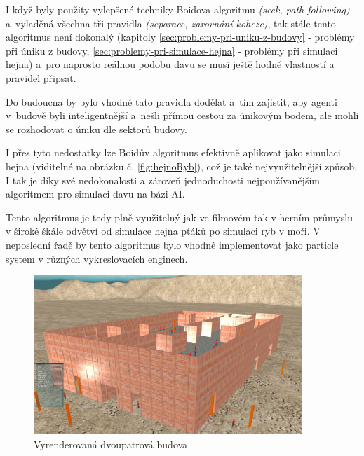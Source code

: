 \documentclass[czech,public,dept460,male,cpdeclaration]{diploma}
\begin{document}

I když byly použity vylepšené techniky Boidova algoritmu \textit{(seek, path following)} a~vyladěná všechna tři pravidla \textit{(separace, zarovnání koheze)}, tak stále tento algoritmus není dokonalý (kapitoly \ref{sec:problemy-pri-uniku-z-budovy} - problémy při úniku z budovy, \ref{sec:problemy-pri-simulace-hejna} - problémy při simulaci hejna) a~pro naprosto reálnou podobu davu se musí ještě hodně vlastností a pravidel připsat.

Do budoucna by bylo vhodné tato pravidla dodělat a~tím zajistit, aby agenti v~budově byli inteligentnější a~nešli přímou cestou za únikovým bodem, ale mohli se rozhodovat o úniku dle sektorů budovy.

I přes tyto nedostatky lze Boidův algoritmus efektivně aplikovat jako simulaci hejna (viditelné na obrázku č. \ref{fig:hejnoRyb}), což je také nejvyužitelnější způsob. I tak je díky své nedokonalosti a zároveň jednoduchosti nejpoužívanějším algoritmem pro simulaci davu na bázi AI.

Tento algoritmus je tedy plně využitelný jak ve filmovém tak v herním průmyslu v široké škále odvětví od simulace hejna ptáků po simulaci ryb v moři. V neposlední řadě by tento algoritmus bylo vhodné implementovat jako particle system \cite{linkToUnity} v různých vykreslovacích enginech.

\newpage

\begin{figure}[H]\centering\includegraphics[width=0.9\textwidth]{Figures/screen8.jpg}
	\caption{Vyrenderovaná dvoupatrová budova}
\end{figure}
\end{document}
